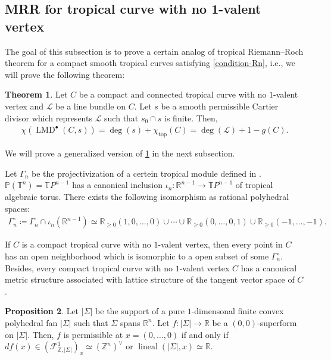 \documentclass[a4paper,dvipdfmx,reqno,12pt]{amsart}
\theoremstyle{definition}
\newtheorem{theorem}{Theorem}[section]
\newtheorem{proposition}[theorem]{Proposition}
\newcommand{\deq}{\coloneqq}
\newcommand{\opn}[1]{\operatorname{#1}}
\numberwithin{equation}{section}
\begin{document}
\subsection{MRR for tropical curve with no 1-valent
vertex}

The goal of this subsection is to prove a certain 
analog of tropical Riemann--Roch theorem for
a compact smooth tropical 
curves satisfying \cref{condition-Rn}, i.e., 
we will prove
the following theorem:
\begin{theorem}
\label{theorem-MRR-metric-graph}
Let $C$ be a compact and connected tropical curve with 
no $1$-valent vertex and 
$\mathcal{L}$ be a line bundle on $C$.
Let $s$ be a smooth permissible Cartier divisor which
represents $\mathcal{L}$ such that 
$s_0\cap s$ is finite. Then,
\begin{align}
  \chi(\opn{LMD}^{\bullet}(C,s))=\opn{deg}(s)+
\chi_{\opn{top}}(C)=\opn{deg}(\mathcal{L})+1-g(C).
\end{align}
\end{theorem}
We will prove a generalized version of 
\cref{theorem-MRR-metric-graph} in the next subsection.

Let $\Gamma_{n}$ be the projectivization of 
a certein tropical module defined in 
\cite[2.2]{mikhalkinTropicalCurvesTheir2008a}.
$\mathbb{P}(\mathbb{T}^{n})=\mathbb{T}P^{n-1}$ has a canonical inclusion
$\iota_n\colon \mathbb{R}^{n-1}\to 
\mathbb{T}P^{n-1}$ 
of tropical algebraic torus.
There exists the following isomorphism as rational 
polyhedral spaces:
\begin{align}
\Gamma_{n}^{\circ}\deq \Gamma_{n}\cap \iota_n(\mathbb{R}^{n-1}) \simeq \mathbb{R}_{\geq 0}(1,0,\ldots,0)\cup \cdots
\cup {\mathbb{R}}_{\geq 0}(0,\ldots,0,1)\cup 
{\mathbb{R}}_{\geq 0}(-1,\ldots,-1).
\end{align}

If $C$ is a compact tropical curve with 
no $1$-valent vertex, then every point in $C$ has 
an open neighborhood which is isomorphic to 
a open subset of some $\Gamma_{n}^{\circ}$.
Besides, every compact tropical curve with 
no $1$-valent vertex $C$ has a canonical metric structure 
associated with lattice structure of the tangent 
vector space of $C$ 
\cite[Proposition 3.6]{mikhalkinTropicalCurvesTheir2008a}.


\begin{proposition}
\label{proposition-permissible-curve}
Let $|\Sigma|$ be the support of a pure $1$-dimensonal 
finite convex polyhedral fan $|\Sigma|$ such that
$\Sigma$ spans $\mathbb{R}^{n}$.
Let $f\colon |\Sigma|\to \mathbb{R}$ be a 
$(0,0)$-superform on $|\Sigma|$. Then, 
$f$ is permissible at $x=(0,\ldots,0)$ if and only if 
$df(x)\in (\mathcal{F}^{1}_{\mathbb{Z},|\Sigma|})_x\simeq (\mathbb{Z}^{n})^{\vee}$
or $\opn{lineal}(|\Sigma|,x)\simeq \mathbb{R}$.

\end{proposition}
\end{document}

